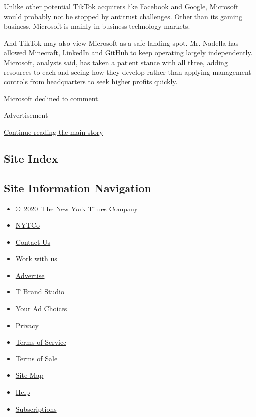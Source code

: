 Unlike other potential TikTok acquirers like Facebook and Google,
Microsoft would probably not be stopped by antitrust challenges. Other
than its gaming business, Microsoft is mainly in business technology
markets.

And TikTok may also view Microsoft as a safe landing spot. Mr. Nadella
has allowed Minecraft, LinkedIn and GitHub to keep operating largely
independently. Microsoft, analysts said, has taken a patient stance with
all three, adding resources to each and seeing how they develop rather
than applying management controls from headquarters to seek higher
profits quickly.

Microsoft declined to comment.

Advertisement

\protect\hyperlink{after-bottom}{Continue reading the main story}

\hypertarget{site-index}{%
\subsection{Site Index}\label{site-index}}

\hypertarget{site-information-navigation}{%
\subsection{Site Information
Navigation}\label{site-information-navigation}}

\begin{itemize}
\tightlist
\item
  \href{https://help.nytimes.com/hc/en-us/articles/115014792127-Copyright-notice}{©~2020~The
  New York Times Company}
\end{itemize}

\begin{itemize}
\tightlist
\item
  \href{https://www.nytco.com/}{NYTCo}
\item
  \href{https://help.nytimes.com/hc/en-us/articles/115015385887-Contact-Us}{Contact
  Us}
\item
  \href{https://www.nytco.com/careers/}{Work with us}
\item
  \href{https://nytmediakit.com/}{Advertise}
\item
  \href{http://www.tbrandstudio.com/}{T Brand Studio}
\item
  \href{https://www.nytimes.com/privacy/cookie-policy\#how-do-i-manage-trackers}{Your
  Ad Choices}
\item
  \href{https://www.nytimes.com/privacy}{Privacy}
\item
  \href{https://help.nytimes.com/hc/en-us/articles/115014893428-Terms-of-service}{Terms
  of Service}
\item
  \href{https://help.nytimes.com/hc/en-us/articles/115014893968-Terms-of-sale}{Terms
  of Sale}
\item
  \href{https://spiderbites.nytimes.com}{Site Map}
\item
  \href{https://help.nytimes.com/hc/en-us}{Help}
\item
  \href{https://www.nytimes.com/subscription?campaignId=37WXW}{Subscriptions}
\end{itemize}
